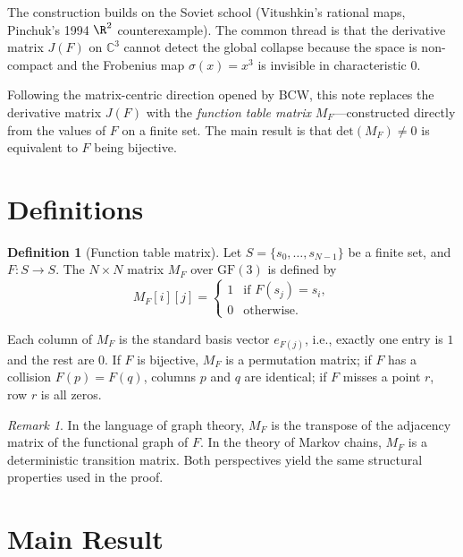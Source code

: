\documentclass[a4paper,11pt]{article}
\theoremstyle{definition}
\newtheorem{definition}[theorem]{Definition}
\theoremstyle{remark}
\newtheorem{remark}[theorem]{Remark}
\newcommand{\GF}{\mathrm{GF}}
\newcommand{\C}{\mathbb{C}}
\newcommand{\MF}{M_F}
\newcommand{\Det}{\mathrm{det}}
\newcommand{\Frob}{\sigma}
\begin{document}
The construction builds on the Soviet school (Vitushkin's rational maps,
Pinchuk's \cite{pinchuk} 1994 $\R^2$ counterexample). The common thread is
that the derivative matrix $J(F)$ on $\C^3$ cannot detect the global collapse
because the space is non-compact and the Frobenius map $\Frob(x)=x^3$ is
invisible in characteristic $0$.

Following the matrix-centric direction opened by BCW, this note replaces the
derivative matrix $J(F)$ with the {\em function table matrix} $\MF$---constructed
directly from the values of $F$ on a finite set. The main result is that
$\Det(\MF)\neq 0$ is equivalent to $F$ being bijective.

\section{Definitions}

\begin{definition}[Function table matrix]
Let $S=\{s_0,\dots,s_{N-1}\}$ be a finite set, and $F:S\to S$. The $N\times N$
matrix $\MF$ over $\GF(3)$ is defined by
\[
\MF[i][j] = \begin{cases}
1 & \text{if } F(s_j) = s_i,\\
0 & \text{otherwise.}
\end{cases}
\]
\end{definition}

Each column of $\MF$ is the standard basis vector $e_{F(j)}$, i.e.,
exactly one entry is $1$ and the rest are $0$. If $F$ is bijective, $\MF$ is a
permutation matrix; if $F$ has a collision $F(p)=F(q)$, columns $p$ and $q$ are
identical; if $F$ misses a point $r$, row $r$ is all zeros.

\begin{remark}
In the language of graph theory, $\MF$ is the transpose of the adjacency
matrix of the functional graph of $F$. In the theory of Markov chains,
$\MF$ is a deterministic transition matrix. Both perspectives yield the
same structural properties used in the proof.
\end{remark}

\section{Main Result}
\end{document}
